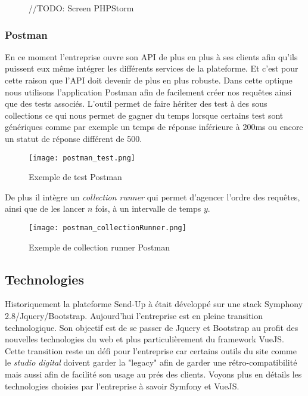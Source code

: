 \begin{figure}[htbp]
    \center 
    //TODO: Screen PHPStorm
\end{figure}


\subsubsection{Postman}

En ce moment l'entreprise ouvre son API de plus en plus à ses clients afin qu'ils puissent eux même intégrer les différents services de la plateforme. Et c'est pour cette raison que l'API doit devenir de plus en plus robuste. Dans cette optique nous utilisons l'application Postman afin de facilement créer nos requêtes ainsi que des tests associés. L'outil permet de faire hériter des test à des sous collections ce qui nous permet de gagner du temps lorsque certains test sont génériques comme par exemple un temps de réponse inférieure à 200ms ou encore un statut de réponse différent de 500. 

\begin{figure}[htbp]
    \center
        \texttt{[image: postman\_test.png]}
        \caption{Exemple de test Postman}
\end{figure}

De plus il intègre un \textit{collection runner} qui permet d'agencer l'ordre des requêtes, ainsi que de les lancer $n$ fois, à un intervalle de temps $y$. 

\begin{figure}[htbp]
    \center
    \texttt{[image: postman\_collectionRunner.png]}
    \caption{Exemple de collection runner Postman}
\end{figure}

\subsection{Technologies}

Historiquement la plateforme Send-Up à était développé sur une stack Symphony 2.8/Jquery/Bootstrap. Aujourd'hui l'entreprise est en pleine transition technologique. Son objectif est de se passer de Jquery et Bootstrap au profit des nouvelles technologies du web et plus particulièrement du framework VueJS. Cette transition reste un défi pour l'entreprise car certains outils du site comme le \textit{studio digital} doivent garder la "legacy" afin de garder une rétro-compatibilité mais aussi afin de facilité son usage au prés des clients. Voyons plus en détails les technologies choisies par l'entreprise à savoir Symfony et VueJS.

